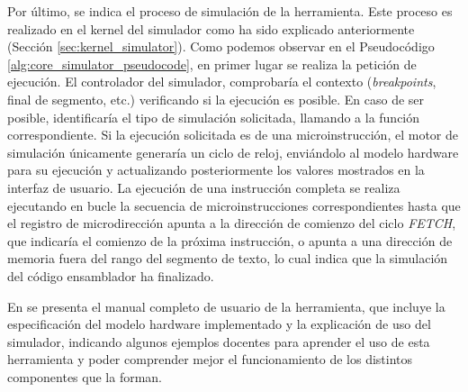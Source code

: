 Por último, se indica el proceso de simulación de la herramienta. Este proceso es realizado en el kernel del simulador como ha sido explicado anteriormente (Sección \ref{sec:kernel_simulator}). Como podemos observar en el Pseudocódigo \ref{alg:core_simulator_pseudocode}, en primer lugar se realiza la petición de ejecución. El controlador del simulador, comprobaría el contexto (\textit{breakpoints}, final de segmento, etc.) verificando si la ejecución es posible. En caso de ser posible, identificaría el tipo de simulación solicitada, llamando a la función correspondiente. Si la ejecución solicitada es de una microinstrucción, el motor de simulación únicamente generaría un ciclo de reloj, enviándolo al modelo \gls{hardware} para su ejecución y actualizando posteriormente los valores mostrados en la interfaz de usuario. La ejecución de una instrucción completa se realiza ejecutando en bucle la secuencia de microinstrucciones correspondientes hasta que el registro de microdirección apunta a la dirección de comienzo del ciclo \textit{FETCH}, que indicaría el comienzo de la próxima instrucción, o apunta a una dirección de memoria fuera del rango del segmento de texto, lo cual indica que la simulación del código \gls{ensamblador} ha finalizado.

En \cite{wepsimManualUser} se presenta el manual completo de usuario de la herramienta, que incluye la especificación del modelo \gls{hardware} implementado y la explicación de uso del simulador, indicando algunos ejemplos docentes para aprender el uso de esta herramienta y poder comprender mejor el funcionamiento de los distintos componentes que la forman.

